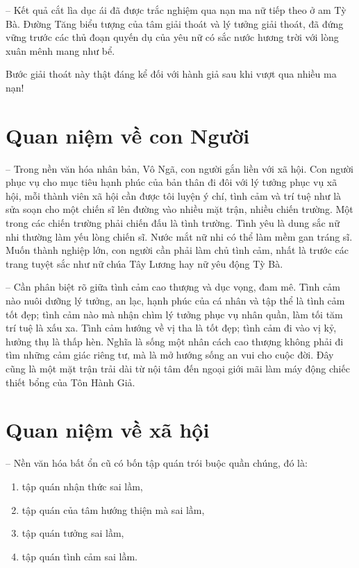 -- Kết quả cắt lìa dục ái đã được trắc nghiệm qua nạn ma nữ tiếp theo ở am Tỳ Bà. Đường Tăng biểu tượng của tâm giải thoát và lý tưởng giải thoát, đã đứng vững trước các thủ đoạn quyến dụ của yêu nữ có sắc nước hương trời với lòng xuân mênh mang như bể.

Bước giải thoát này thật đáng kể đối với hành giả sau khi vượt qua nhiều ma nạn!

\section{Quan niệm về con Người} %
\label{sec:53_54_con_nguoi}

-- Trong nền văn hóa nhân bản, Vô Ngã, con người gắn liền với xã hội. Con người phục vụ cho mục tiêu hạnh phúc của bản thân đi đôi với lý tưởng phục vụ xã hội, mỗi thành viên xã hội cần được tôi luyện ý chí, tình cảm và trí tuệ như là sửa soạn cho một chiến sĩ lên đường vào nhiều mặt trận, nhiều chiến trường. Một trong các chiến trường phải chiến đấu là tình trường. Tình yêu là dung sắc nữ nhi thường làm yếu lòng chiến sĩ. Nước mắt nữ nhi có thể làm mềm gan tráng sĩ. Muốn thành nghiệp lớn, con người cần phải làm chủ tình cảm, nhất là trước các trang tuyệt sắc như nữ chúa Tây Lương hay nữ yêu động Tỳ Bà.

-- Cần phân biệt rõ giữa tình cảm cao thượng và dục vọng, đam mê. Tình cảm nào nuôi dưỡng lý tưởng, an lạc, hạnh phúc của cá nhân và tập thể là tình cảm tốt đẹp; tình cảm nào mà nhận chìm lý tưởng phục vụ nhân quần, làm tối tăm trí tuệ là xấu xa. Tình cảm hướng về vị tha là tốt đẹp; tình cảm đi vào vị kỷ, hưởng thụ là thấp hèn. Nghĩa là sống một nhân cách cao thượng không phải đi tìm những cảm giác riêng tư, mà là mở hướng sống an vui cho cuộc đời. Đây cũng là một mặt trận trải dài từ nội tâm đến ngoại giới mãi làm máy động chiếc thiết bổng của Tôn Hành Giả.

\section{Quan niệm về xã hội} %
\label{sec:53_54_xa_hoi}

-- Nền văn hóa bất ổn cũ có bốn tập quán trói buộc quần chúng, đó là:

\begin{enumerate}[label=\itshape\arabic*\upshape/]
    \item tập quán nhận thức sai lầm,

    \item tập quán của tâm hướng thiện mà sai lầm,

    \item tập quán tưởng sai lầm,

    \item tập quán tình cảm sai lầm.
\end{enumerate}

